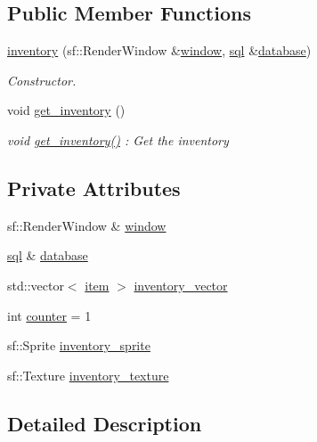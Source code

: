 \subsection*{Public Member Functions}
\begin{DoxyCompactItemize}
\item 
\hyperlink{classinventory_a0c767f0886d01023984f4b06372ca626}{inventory} (sf\+::\+Render\+Window \&\hyperlink{classinventory_a699933dd5f2c8a98088ec92cbf2d5bcc}{window}, \hyperlink{classsql}{sql} \&\hyperlink{classinventory_a6d18133706ef066978817d32130bf560}{database})
\begin{DoxyCompactList}\small\item\em Constructor. \end{DoxyCompactList}\item 
void \hyperlink{classinventory_abb6d846e4b7297f79c2c9fb34b26fee2}{get\+\_\+inventory} ()
\begin{DoxyCompactList}\small\item\em void \hyperlink{classinventory_abb6d846e4b7297f79c2c9fb34b26fee2}{get\+\_\+inventory()} \+: Get the inventory \end{DoxyCompactList}\end{DoxyCompactItemize}
\subsection*{Private Attributes}
\begin{DoxyCompactItemize}
\item 
sf\+::\+Render\+Window \& \hyperlink{classinventory_a699933dd5f2c8a98088ec92cbf2d5bcc}{window}
\item 
\hyperlink{classsql}{sql} \& \hyperlink{classinventory_a6d18133706ef066978817d32130bf560}{database}
\item 
std\+::vector$<$ \hyperlink{classitem}{item} $>$ \hyperlink{classinventory_ac9ae72d119fe30ef46df9b8c05faed61}{inventory\+\_\+vector}
\item 
int \hyperlink{classinventory_abc26ad2f285ce00ab783726872007d89}{counter} = 1
\item 
sf\+::\+Sprite \hyperlink{classinventory_adb8d5ebeb0dada8462c1f4246d87c8e4}{inventory\+\_\+sprite}
\item 
sf\+::\+Texture \hyperlink{classinventory_a1c0ceddc587277e92c8a389eb7a9b139}{inventory\+\_\+texture}
\end{DoxyCompactItemize}


\subsection{Detailed Description}


